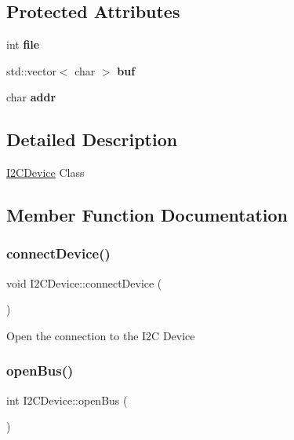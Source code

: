 \subsection*{Protected Attributes}
\begin{DoxyCompactItemize}
\item 
\mbox{\label{classI2CDevice_aab6762690a7288b436e408752fedc1ad}} 
int {\bfseries file}
\item 
\mbox{\label{classI2CDevice_a3c99b92a232fc4a7394e97caec29bddf}} 
std\+::vector$<$ char $>$ {\bfseries buf}
\item 
\mbox{\label{classI2CDevice_a59a88fa7b1efd226ffd97c08fb5ece6a}} 
char {\bfseries addr}
\end{DoxyCompactItemize}


\subsection{Detailed Description}
\hyperlink{classI2CDevice}{I2\+C\+Device} Class 

\subsection{Member Function Documentation}
\mbox{\label{classI2CDevice_a97ce3e695080f667e4acfa4c6fe82ba4}} 
\subsubsection{\texorpdfstring{connect\+Device()}{connectDevice()}}
{\footnotesize\ttfamily void I2\+C\+Device\+::connect\+Device (\begin{DoxyParamCaption}{ }\end{DoxyParamCaption})\hspace{0.3cm}{\ttfamily [protected]}}

Open the connection to the I2C Device\mbox{\label{classI2CDevice_a5fde7fd1a0060a67fc79508cadf6aace}} 
\subsubsection{\texorpdfstring{open\+Bus()}{openBus()}}
{\footnotesize\ttfamily int I2\+C\+Device\+::open\+Bus (\begin{DoxyParamCaption}{ }\end{DoxyParamCaption})\hspace{0.3cm}{\ttfamily [protected]}}

